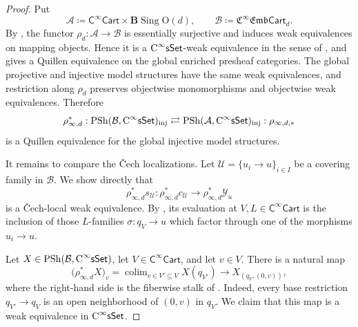 \documentclass{amsart}
\newcommand{\cat}[1]{\mathsf{#1}}
\newcommand{\sset}{\cat{sSet}}
\DeclareMathOperator*{\colim}{colim}
\newcommand{\inj}{\textnormal{inj}}
\DeclareMathOperator{\Sing}{Sing}
\newcommand{\CsSet}{\textnormal{C}^{\infty}\sset}
\newcommand{\Cart}{\cat{C}^{\infty}\cat{Cart}}
\newcommand{\fembcart}[1]{\mathfrak{C}^{\infty}\mathfrak{Emb}\cat{Cart}_{#1}}
\newcommand{\psh}{\mathrm{PSh}}
\newcommand{\Yo}{\mathscr{Y}}
\theoremstyle{definition}
\numberwithin{equation}{subsection}
\numberwithin{subsubsection}{subsection}
\begin{document}
\begin{proof}
  Put
  \[
    \mathcal{A}\coloneqq
    \Cart\times\mathbf{B}\Sing\mathrm{O}(d),
    \qquad
    \mathcal{B}\coloneqq\fembcart{d}.
  \]
  By , the functor
  \(\rho_d:\mathcal{A}\to\mathcal{B}\) is essentially surjective and
  induces weak equivalences on mapping objects. Hence it is a
  \(\CsSet\)-weak equivalence in the sense of
  \cite[Definition~2.3(iv)]{GM20}, and
  \cite[Proposition~2.4]{GM20} gives a Quillen equivalence on the global
  enriched presheaf categories. The global projective and injective model
  structures have the same weak equivalences, and restriction along
  \(\rho_d\) preserves objectwise monomorphisms and objectwise weak
  equivalences. Therefore
  \[
    \rho^{*}_{\infty,d}:
    \psh(\mathcal{B},\CsSet)_{\inj}
    \rightleftarrows
    \psh(\mathcal{A},\CsSet)_{\inj}
    :\rho_{\infty,d,*}
  \]
  is a Quillen equivalence for the global injective model structures.

  It remains to compare the \v{C}ech localizations. Let
  \(\mathcal{U}=\{u_i\to u\}_{i\in I}\) be a covering family in
  \(\mathcal{B}\). We show directly that
  \[
    \rho_{\infty,d}^{*}s_{\mathcal{U}}:
    \rho_{\infty,d}^{*}c_{\mathcal{U}}
    \longrightarrow
    \rho_{\infty,d}^{*}\Yo_u
  \]
  is a \v{C}ech-local weak equivalence. By
  , its evaluation at
  \(V,L\in\Cart\) is the inclusion of those \(L\)-families
  \(\sigma:q_V\to u\) which factor through one of the morphisms
  \(u_i\to u\).

  Let \(X\in\psh(\mathcal{B},\CsSet)\), let \(V\in\Cart\), and let \(v\in V\).
  There is a natural map
  \[
    \bigl(\rho_{\infty,d}^{*}X\bigr)_v
    =
    \colim_{v\in V'\subseteq V}X(q_{V'})
    \longrightarrow
    X_{(q_V,(0,v))},
  \]
  where the right-hand side is the fiberwise stalk of
  . Indeed, every base restriction
  \(q_{V'}\to q_V\) is an open neighborhood
  of \((0,v)\) in \(q_V\). We claim that this map is a weak equivalence in
  \(\CsSet\).


\end{proof}
\end{document}
